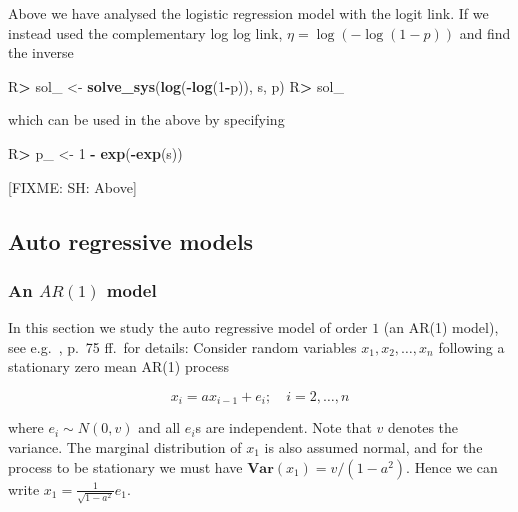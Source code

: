 \documentclass[10pt,]{article}
\newenvironment{Shaded}{\begin{snugshade}}{\end{snugshade}}
\newcommand{\DecValTok}[1]{\textcolor[rgb]{0.00,0.00,0.81}{#1}}
\newcommand{\KeywordTok}[1]{\textcolor[rgb]{0.13,0.29,0.53}{\textbf{#1}}}
\newcommand{\NormalTok}[1]{#1}
\newcommand{\OperatorTok}[1]{\textcolor[rgb]{0.81,0.36,0.00}{\textbf{#1}}}
\newcommand{\StringTok}[1]{\textcolor[rgb]{0.31,0.60,0.02}{#1}}
\begin{document}
Above we have analysed the logistic regression model with the logit
link. If we instead used the complementary log log link,
\(\eta = \log(-\log(1-p))\) and find the inverse

\begin{Shaded}
\begin{Highlighting}[]
\NormalTok{R}\OperatorTok{>}\StringTok{ }\NormalTok{sol_ <-}\StringTok{ }\KeywordTok{solve_sys}\NormalTok{(}\KeywordTok{log}\NormalTok{(}\OperatorTok{-}\KeywordTok{log}\NormalTok{(}\DecValTok{1}\OperatorTok{-}\NormalTok{p)), s, p)}
\NormalTok{R}\OperatorTok{>}\StringTok{ }\NormalTok{sol_}
\end{Highlighting}
\end{Shaded}

which can be used in the above by specifying

\begin{Shaded}
\begin{Highlighting}[]
\NormalTok{R}\OperatorTok{>}\StringTok{ }\NormalTok{p_ <-}\StringTok{ }\DecValTok{1} \OperatorTok{-}\StringTok{ }\KeywordTok{exp}\NormalTok{(}\OperatorTok{-}\KeywordTok{exp}\NormalTok{(s))}
\end{Highlighting}
\end{Shaded}

{[}FIXME: SH: Above{]}

\hypertarget{sec:ar1}{%
\subsection{Auto regressive models}\label{sec:ar1}}

\hypertarget{an-ar1-model}{%
\subsubsection{\texorpdfstring{An \(AR(1)\)
model}{An AR(1) model}}\label{an-ar1-model}}

In this section we study the auto regressive model of order \(1\) (an
AR(1) model), see e.g.~\citep{shumway:etal:16}, p.~75 ff.~for details:
Consider random variables \(x_1, x_2, \dots, x_n\) following a
stationary zero mean AR(1) process

\begin{equation}
  \label{eq:ar1}
  x_i = a x_{i-1} + e_i; \quad i=2, \dots, n
\end{equation}

where \(e_i \sim N(0, v)\) and all \(e_i\)s are independent. Note that
\(v\) denotes the variance. The marginal distribution of \(x_1\) is also
assumed normal, and for the process to be stationary we must have
\(\mathbf{Var}(x_1) = v / (1-a^2)\). Hence we can write
\(x_1 = \frac 1 {\sqrt{1-a^2}} e_1\).
\end{document}
